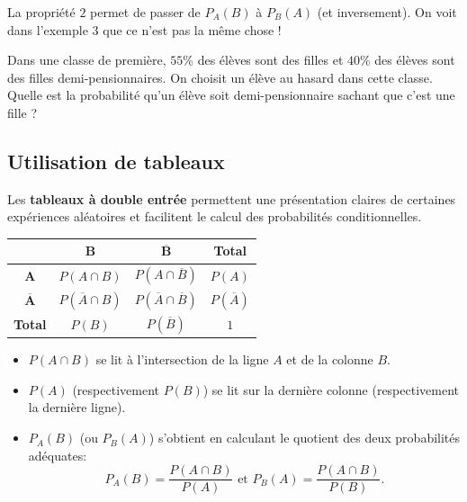 \documentclass[11pt]{article}
\begin{document}
\begin{rmq}
  La propriété $2$ permet de passer de $P_A(B)$ à $P_B(A)$ (et inversement). On
  voit dans l'exemple $3$ que ce n'est pas la même chose !
\end{rmq}

\begin{app}
  Dans une classe de première, $55$\% des élèves sont des filles et $40$\% des
  élèves sont des filles demi-pensionnaires. On choisit un élève au hasard dans
  cette classe. Quelle est la probabilité qu'un élève soit demi-pensionnaire
  sachant que c'est une fille ?
\end{app}

\subsection{Utilisation de tableaux}

\begin{notation}
Les \textbf{tableaux à double entrée} permettent une présentation claires de certaines
expériences aléatoires et facilitent le calcul des probabilités conditionnelles.
\begin{center}
\renewcommand{\arraystretch}{1.5}
\begin{tabular}{cccc}
  \toprule
  & $\mathbf{B}$ & $\mathbf{\overline B}$ & \textbf{Total} \\ \midrule
  $\mathbf{A}$ & $P(A\cap B)$ & $P(A\cap\overline B)$ & $P(A)$ \\
  $\mathbf{\overline A}$ & $P(\overline A\cap B)$ & $P(\overline A\cap\overline
  B)$ & $P(\overline A)$ \\
  \textbf{Total} & $P(B)$ & $P(\overline B)$ & $1$ \\ \bottomrule
\end{tabular}
\end{center}
\begin{itemize}
  \item $P(A\cap B)$ se lit à l'intersection de la ligne $A$ et de la colonne
    $B$.
  \item $P(A)$ (respectivement $P(B)$) se lit sur la dernière colonne
    (respectivement la dernière ligne).
  \item $P_A(B)$ (ou $P_B(A)$) s'obtient en calculant le quotient des deux
    probabilités adéquates:
    \[
      P_A(B) = \frac{P(A\cap B)}{P(A)}\text{ et }P_B(A) = \frac{P(A\cap
      B)}{P(B)}.
    \]
\end{itemize}
\end{notation}
\end{document}
